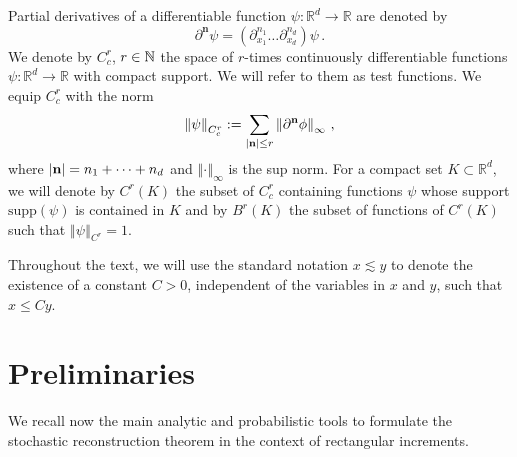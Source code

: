 \documentclass[12pt]{article}
\numberwithin{equation}{section}
\theoremstyle{plain}
\theoremstyle{definition}
\newcommand{\abs}[1]{\left\vert #1 \right\vert}
\newcommand{\norm}[1]{\left\Vert #1\right\Vert}
\newcommand{\R}{\ensuremath{{\mathbb R}}}
\def\bR{\mathbb{R}}\def\bS{\mathbb{S}}
\def\fk{\mathbf k}\def\fl{\mathbf l}
\def\fy{\mathbf y}\def\fz{\mathbf z}
\def\supp{\mbox{supp}}
\begin{document}
Partial derivatives of  a differentiable function $\psi\colon \R^d\to \R$ are denoted by
\[\partial^{\mathbf{n}}\psi= (\partial^{n_1}_{x_1}\ldots\partial^{n_d}_{x_d})\psi\,.\]
We denote by $C^r_c$, $r\in \mathbb{N}$ the space of $r$-times continuously differentiable functions $\psi\colon \R^d\to \R$ with compact support. We will refer to them as test functions. We equip $C^r_c$ with the norm
\begin{equation*}
    \norm{\psi}_{C^r_c} := \sum_{\abs{\fn}\le r} \norm{\partial^\fn\phi}_\infty\,,
\end{equation*}
where $\abs{\fn}= n_1+ \cdots + n_d$ and $\norm{\cdot}_\infty$ is the sup norm. %
For a compact set $K\subset\bR^d$, we will denote by $C^r(K)$  the subset of $C^r_c$  containing functions $\psi$ whose  support $\supp(\psi) $ is contained in $K$ and by   $B^r(K)$ the subset of functions of $C^r(K)$ such that $\norm{\psi}_{C^r}=1$. 



Throughout the text, we will use the standard notation $x \lesssim y$ to denote the existence of a constant $C > 0$, independent of the variables in $x$ and $y$, such that $x\leq C y$.

\section{Preliminaries}\label{sec:preliminaries}
We recall now the main analytic and probabilistic tools to formulate the stochastic reconstruction theorem in the context of rectangular increments.
\end{document}
